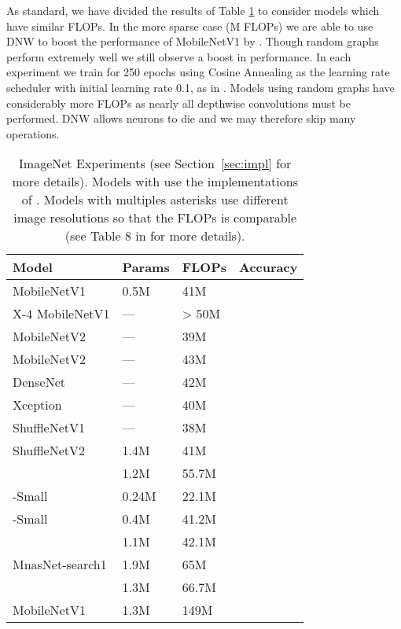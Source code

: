 \documentclass{article}
\newcommand*{\smn}{\text{MobileNetV1-DNW}}
\newcommand*{\rg}{\text{MobileNetV1-RG}}
\begin{document}
As standard, we have divided the results of Table \ref{tab:imagenet} to consider models which have similar FLOPs. In the more sparse case (M FLOPs) we are able to use DNW to boost the performance of MobileNetV1 by . Though random graphs perform extremely well we still observe a  boost in performance. In each experiment we train for 250 epochs using Cosine Annealing as the learning rate scheduler with initial learning rate 0.1, as in \cite{randwire}. Models using random graphs have considerably more FLOPs as nearly all depthwise convolutions must be performed. DNW allows neurons to die and we may therefore skip many operations.

\begin{table}
  \caption{ImageNet Experiments (see Section~\ref{sec:impl} for more details). Models with  use the implementations of \cite{shufflenetv2}. Models with multiples asterisks use different image resolutions so that the FLOPs is comparable (see Table 8 in \cite{shufflenetv2} for more details).}
  \label{tab:imagenet}
  \small
  \centering
  \begin{tabular}{llll}
    \toprule
    Model   &Params  & FLOPs     & Accuracy \\
    \midrule
    MobileNetV1  \cite{mobilenetv1} & 0.5M & 41M  &      \\
    X-4 MobileNetV1 \cite{xnets} & --- & > 50M  &      \\
    MobileNetV2  \cite{mobilenetv2} & --- & 39M  &      \\
    MobileNetV2  & --- & 43M  &      \\
    DenseNet  \cite{densenet} & --- & 42M  &      \\
    Xception  \cite{xception} & --- & 40M  &      \\
    ShuffleNetV1  \cite{shufflenet} & --- & 38M  &      \\
    ShuffleNetV2  \cite{shufflenetv2} & 1.4M & 41M  &      \\
    \rg  & 1.2M & 55.7M  &      \\
    \smn-Small  & 0.24M & 22.1M  &      \\
    \smn-Small  & 0.4M & 41.2M  &      \\
    \smn  & 1.1M & 42.1M  &      \\
    \midrule
    MnasNet-search1 \cite{mnasnet}& 1.9M & 65M  &      \\
    \smn  & 1.3M & 66.7M  &      \\
    \midrule
    MobileNetV1  & 1.3M & 149M  &      \\

\end{tabular}
\end{table}
\end{document}

